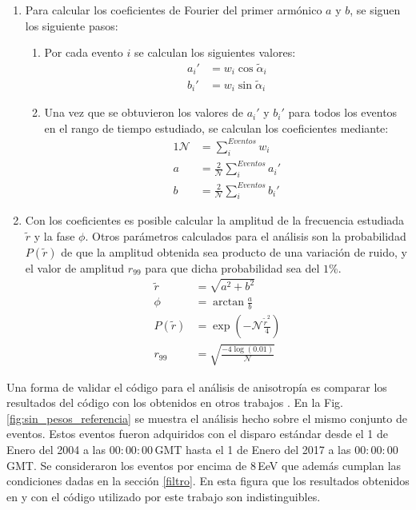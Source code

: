 \begin{enumerate}
        \item Para calcular los coeficientes de Fourier del primer armónico $a$ y $b$, se siguen los siguiente pasos:
        \begin{enumerate}
          \item Por cada evento  $i$ se calculan los siguientes valores:
          \begin{align}
             a_i' &= {w_i}\cos\tilde{\alpha}_i \\
             b_i' &= {w_i}\sin\tilde{\alpha}_i
         \end{align}
         \item Una vez que se obtuvieron los valores de $a_i'$ y $b_i'$ para todos los eventos en el rango de tiempo estudiado, se calculan los coeficientes mediante:
         \begin{alignat}{1}
          \mathcal{N} &= \sum^{Eventos}_i w_i \\
            a &= \frac{2}{\mathcal{N}} \sum^{Eventos}_i a_i' \\
            b &= \frac{2}{\mathcal{N}} \sum^{Eventos}_i b_i'  
         \end{alignat}
        \end{enumerate}
        \item Con los coeficientes es posible calcular la amplitud de la frecuencia estudiada $\tilde{r}$ y la fase $\phi$. Otros parámetros calculados para el análisis son la probabilidad $P(\tilde{r})$ de que la amplitud obtenida sea producto de una variación de ruido, y el valor de amplitud $r_{99}$ para que dicha probabilidad sea del $1$\%. 
        \begin{align}
            \tilde{r} &= \sqrt{a^2 +b^2} \\            
            \phi&= \arctan\frac{a}{b}\\
            P(\tilde{r})&= \exp(-\mathcal{N}\frac{\tilde{r}^2}{4}) \\
            r_{99}&= \sqrt{\frac{-4\log(0.01)}{\mathcal{N}}}
        \end{align}

      \end{enumerate}

    Una forma de validar el código para el análisis de anisotropía es comparar los resultados del código con los obtenidos en otros trabajos \cite{taborda}. En la Fig.\ref{fig:sin_pesos_referencia} se muestra el análisis hecho sobre el mismo conjunto de eventos. Estos eventos fueron adquiridos con el disparo estándar desde el 1 de Enero del 2004 a las $00:00:00\,$GMT  hasta el 1 de Enero del 2017 a las $00:00:00\,$GMT. Se consideraron los eventos por encima de $8\,$EeV que además cumplan las condiciones dadas en la sección \ref{filtro}.  En esta figura que los resultados obtenidos en \cite{taborda} y con el código utilizado por este trabajo son indistinguibles. 

